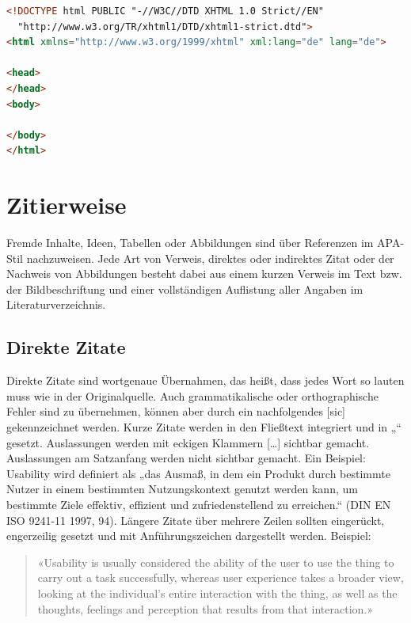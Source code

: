 \begin{lstlisting}[language=HTML,caption={So sieht Code schön aus.},captionpos=b,label=code:arduino_blink]
<!DOCTYPE html PUBLIC "-//W3C//DTD XHTML 1.0 Strict//EN"
  "http://www.w3.org/TR/xhtml1/DTD/xhtml1-strict.dtd">
<html xmlns="http://www.w3.org/1999/xhtml" xml:lang="de" lang="de">

<head>
</head>
<body>

</body>
</html>
\end{lstlisting}


\section{Zitierweise}\label{subsec:zitierweise}

Fremde Inhalte, Ideen, Tabellen oder Abbildungen sind über Referenzen im APA-Stil nachzuweisen. Jede Art von Verweis, direktes oder indirektes Zitat oder der Nachweis von Abbildungen besteht dabei aus einem kurzen Verweis im Text bzw. der Bildbeschriftung und einer vollständigen Auflistung aller Angaben im Literaturverzeichnis.

\subsection{Direkte Zitate}\label{subsubsec:direkte}

Direkte Zitate sind wortgenaue Übernahmen, das heißt, dass jedes Wort so lauten muss wie in der Originalquelle. Auch grammatikalische oder orthographische Fehler sind zu übernehmen, können aber durch ein nachfolgendes [sic] gekennzeichnet werden. Kurze Zitate werden in den Fließtext integriert und in „“ gesetzt. Auslassungen werden mit eckigen Klammern […] sichtbar gemacht. Auslassungen am Satzanfang werden nicht sichtbar gemacht. Ein Beispiel: Usability wird definiert als „das Ausmaß, in dem ein Produkt durch bestimmte Nutzer in einem bestimmten Nutzungskontext genutzt werden kann, um bestimmte Ziele effektiv, effizient und zufriedenstellend zu erreichen.“ (DIN EN ISO 9241-11 1997, 94). Längere Zitate über mehrere Zeilen sollten eingerückt, engerzeilig gesetzt und mit Anführungszeichen dargestellt werden. Beispiel:


\begin{quote}
«Usability is usually considered the ability of the user to use the thing to carry out a task successfully, whereas user experience takes a broader view, looking at the individual’s entire interaction with the thing, as well as the thoughts, feelings and perception that results from that interaction.»
\cite[S. 4]{albert2013measuring}
\end{quote}

